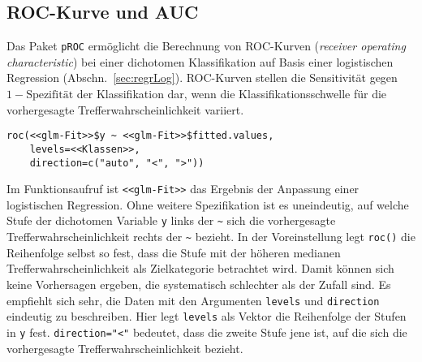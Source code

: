 \subsection{ROC-Kurve und AUC}
\label{sec:rocAuc}

Das Paket \lstinline!pROC! \cite{Robin2011} ermöglicht die Berechnung von ROC-Kurven (\emph{receiver operating characteristic}) bei einer dichotomen Klassifikation auf Basis einer logistischen Regression (Abschn.\ \ref{sec:regrLog}). ROC-Kurven stellen die Sensitivität gegen $1 - \text{Spezifität}$ der Klassifikation dar, wenn die Klassifikationsschwelle für die vorhergesagte Trefferwahrscheinlichkeit variiert.
\begin{lstlisting}
roc(<<glm-Fit>>$y ~ <<glm-Fit>>$fitted.values,
    levels=<<Klassen>>,
    direction=c("auto", "<", ">"))
\end{lstlisting}

Im Funktionsaufruf ist \lstinline!<<glm-Fit>>! das Ergebnis der Anpassung einer logistischen Regression. Ohne weitere Spezifikation ist es uneindeutig, auf welche Stufe der dichotomen Variable \lstinline!y! links der \lstinline!~! sich die vorhergesagte Trefferwahrscheinlichkeit rechts der \lstinline!~! bezieht. In der Voreinstellung legt \lstinline!roc()! die Reihenfolge selbst so fest, dass die Stufe mit der höheren medianen Trefferwahrscheinlichkeit als Zielkategorie betrachtet wird. Damit können sich keine Vorhersagen ergeben, die systematisch schlechter als der Zufall sind. Es empfiehlt sich sehr, die Daten mit den Argumenten \lstinline!levels! und \lstinline!direction! eindeutig zu beschreiben. Hier legt \lstinline!levels! als Vektor die Reihenfolge der Stufen in \lstinline!y! fest. \lstinline!direction="<"! bedeutet, dass die zweite Stufe jene ist, auf die sich die vorhergesagte Trefferwahrscheinlichkeit bezieht.

